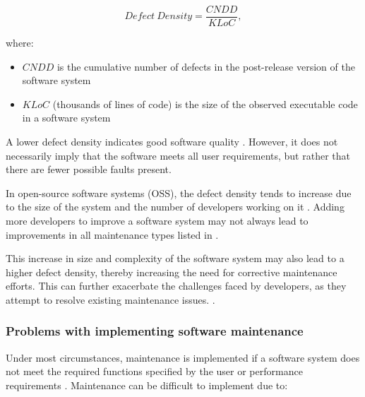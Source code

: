 \begin{equation}
	\label{eq:ch1_defectDensity}
	Defect~Density = \frac{CNDD}{KLoC},
\end{equation}

where:

\begin{itemize}
	\item $CNDD$ is the cumulative number of defects in the post-release version of the software system
	\item $KLoC$ (thousands of lines of code) is the size of the observed executable code in a software system 
\end{itemize}

A lower defect density indicates good software quality \cite{Shah2012, Alenezi2016}. However, it does not necessarily imply that the software meets all user requirements, but rather that there are fewer possible faults present.\par In open-source software systems (OSS), the defect density tends to increase due to the size of the system and the number of developers working on it \cite{Rahmani2010}. Adding more developers to improve a software system may not always lead to improvements in all maintenance types listed in .\par This increase in size and complexity of the software system may also lead to a higher defect density, thereby increasing the need for corrective maintenance efforts. This can further exacerbate the challenges faced by developers, as they attempt to resolve existing maintenance issues. \cite{SourceForged2009}.

\subsubsection{Problems with implementing software maintenance}\label{sec:ch1_maintenanceProblems}
Under most circumstances, maintenance is implemented if a software system does not meet the required functions specified by the user or performance requirements \cite{Ogheneovo2014, Sneed2004}. Maintenance can be difficult to implement due to:

